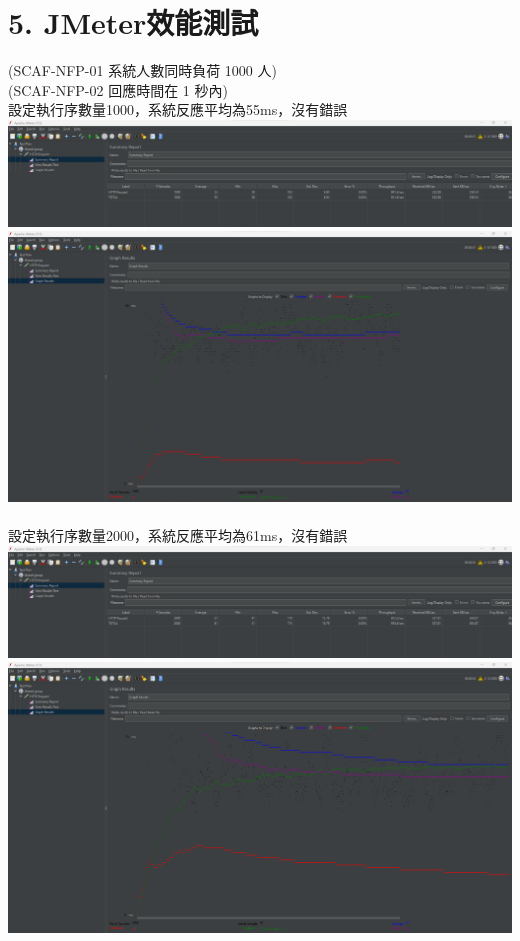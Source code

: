 \documentclass{report}
\begin{document}
\section*{5. JMeter效能測試}
\graphicspath{ {./images} }
(SCAF-NFP-01 系統人數同時負荷 1000 人)\\
(SCAF-NFP-02 回應時間在 1 秒內)\\
設定執行序數量1000，系統反應平均為55ms，沒有錯誤\\
\includegraphics[scale=0.35]{1000_1.png}
\includegraphics[scale=0.35]{1000_2.png}
\\
\newline
\\
設定執行序數量2000，系統反應平均為61ms，沒有錯誤 \\
\includegraphics[scale=0.35]{2000_1.png}
\includegraphics[scale=0.35]{2000_2.png}
\end{document}
